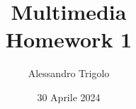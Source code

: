 \title{\vspace{160px} \textbf{\huge{Multimedia}} \\\vspace{17.5px} \LARGE{Homework 1}  \vspace{10px}}
\author{Alessandro Trigolo}
\date{30 Aprile 2024}



\maketitle\newpage




